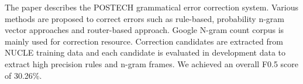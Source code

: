 The paper describes the POSTECH grammatical error correction system. Various methods are proposed to correct errors such as rule-based, probability n-gram vector approaches and router-based approach. Google N-gram count corpus is mainly used for correction resource. Correction candidates are extracted from NUCLE training data and each candidate is evaluated in development data to extract high precision rules and n-gram frames. We achieved an overall F0.5 score of 30.26\%.
